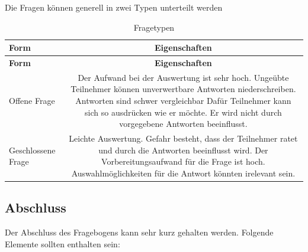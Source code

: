 Die Fragen können generell in zwei Typen unterteilt werden

\begin{longtable}[c]{@{}lc@{}}
\caption{Fragetypen}\tabularnewline
\toprule
\begin{minipage}[b]{0.24\columnwidth}\raggedright\strut
\textbf{Form}
\strut\end{minipage} &
\begin{minipage}[b]{0.70\columnwidth}\centering\strut
\textbf{Eigenschaften}
\strut\end{minipage}\tabularnewline
\midrule
\endfirsthead
\toprule
\begin{minipage}[b]{0.24\columnwidth}\raggedright\strut
\textbf{Form}
\strut\end{minipage} &
\begin{minipage}[b]{0.70\columnwidth}\centering\strut
\textbf{Eigenschaften}
\strut\end{minipage}\tabularnewline
\midrule
\endhead
\begin{minipage}[t]{0.24\columnwidth}\raggedright\strut
Offene Frage
\strut\end{minipage} &
\begin{minipage}[t]{0.70\columnwidth}\centering\strut
Der Aufwand bei der Auswertung ist sehr hoch. Ungeübte Teilnehmer können
unverwertbare Antworten niederschreiben. Antworten sind schwer
vergleichbar Dafür Teilnehmer kann sich so ausdrücken wie er möchte. Er
wird nicht durch vorgegebene Antworten beeinflusst.
\strut\end{minipage}\tabularnewline
\begin{minipage}[t]{0.24\columnwidth}\raggedright\strut
Geschlossene Frage
\strut\end{minipage} &
\begin{minipage}[t]{0.70\columnwidth}\centering\strut
Leichte Auswertung. Gefahr besteht, dass der Teilnehmer ratet und durch
die Antworten beeinflusst wird. Der Vorbereitungsaufwand für die Frage
ist hoch. Auswahlmöglichkeiten für die Antwort könnten irelevant sein.
\strut\end{minipage}\tabularnewline
\bottomrule
\end{longtable}

\subsection{Abschluss}\label{abschluss}

Der Abschluss des Fragebogens kann sehr kurz gehalten werden. Folgende
Elemente sollten enthalten sein:

